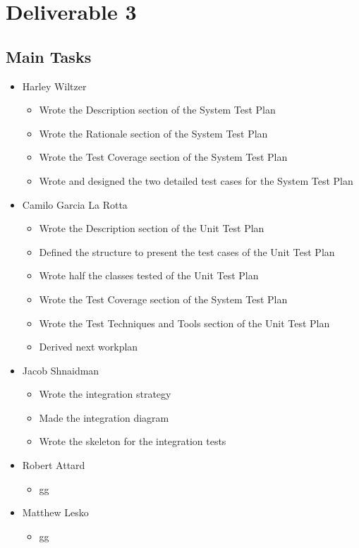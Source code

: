\documentclass[12pt]{article}
\begin{document}
\newpage
 \section{Deliverable 3}
%
 \subsection{Main Tasks}
%
%
 \begin{itemize}
     \item Harley Wiltzer
 	\begin{itemize}
 		\item Wrote the Description section of the System Test Plan
		\item Wrote the Rationale section of the System Test Plan
		\item Wrote the Test Coverage section of the System Test Plan
		\item Wrote and designed the two detailed test cases for the System Test Plan
 	\end{itemize}
     \item Camilo Garcia La Rotta
     \begin{itemize}
        \item Wrote the Description section of the Unit Test Plan
		\item Defined the structure to present the test cases of the Unit Test Plan
		\item Wrote half the classes tested of the Unit Test Plan
		\item Wrote the Test Coverage section of the System Test Plan
		\item Wrote the Test Techniques and Tools section of the Unit Test Plan
		\item Derived next workplan
     \end{itemize}
     \item Jacob Shnaidman
 		\begin{itemize}
 			\item Wrote the integration strategy
			\item Made the integration diagram
			\item Wrote the skeleton for the integration tests
 		\end{itemize}
     \item Robert Attard
     \begin{itemize}
         \item gg
     \end{itemize}
     \item Matthew Lesko
     \begin{itemize}
     	\item gg
     \end{itemize}
 \end{itemize}
%
\end{document}
